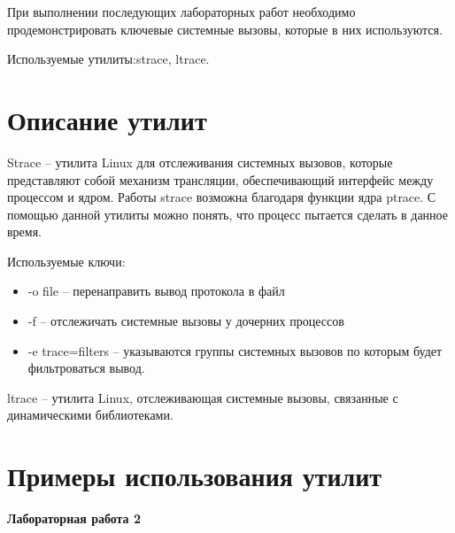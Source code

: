 \documentclass[pdf, unicode, 12pt, a4paper,oneside,fleqn]{article}
\begin{document}
При выполнении последующих лабораторных работ необходимо продемонстрировать 
ключевые системные вызовы, которые в них используются.

Используемые утилиты:strace, ltrace.

\section{Описание утилит}

Strace \--- утилита Linux для отслеживания системных вызовов, которые представляют собой
механизм трансляции, обеспечивающий интерфейс между процессом и ядром. Работы strace возможна
благодаря функции ядра ptrace. С помощью данной утилиты можно понять, что процесс пытается сделать в данное время.

Используемые ключи:

\begin{itemize}
    \item -o file \--- перенаправить вывод протокола в файл
    \item -f \--- отслежичать системные вызовы у дочерних процессов
    \item -e trace=filters \--- указываются группы системных вызовов по которым будет фильтроваться вывод.
\end{itemize}

ltrace \--- утилита Linux, отслеживающая системные вызовы, связанные с динамическими библиотеками.

\section{Примеры использования утилит}

{\large\textbf{Лабораторная работа 2}}
\end{document}
